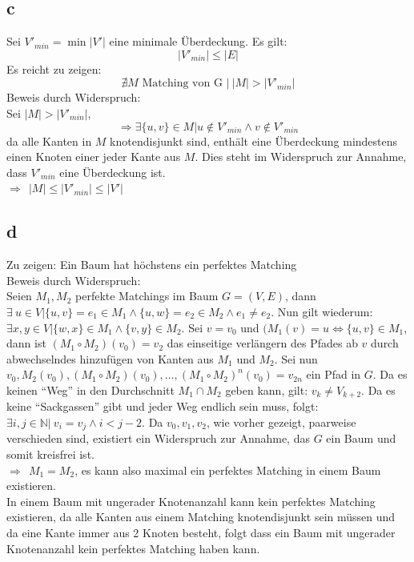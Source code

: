 \documentclass[a4paper,11pt,twoside]{scrartcl}
\begin{document}
\subsection*{c}
Sei $V'_{min} = \min{|V'|}$ eine minimale Überdeckung. Es gilt:
\[ |V'_{min}| \leq |E| \]
Es reicht zu zeigen:
\[ \nexists M \text{ Matching von G }| ~|M| > |V'_{min}| \]
Beweis durch Widerspruch:\\
Sei $|M| > |V'_{min}|$,
\[ \Rightarrow \exists \{u,v\} \in M | u \notin V'_{min} \land v \notin V'_{min} \]
da alle Kanten in $M$ knotendisjunkt sind, enthält eine Überdeckung mindestens einen Knoten einer jeder Kante aus $M$. Dies steht im Widerspruch zur Annahme, dass $V'_{min}$ eine Überdeckung ist.\\
$\Rightarrow~~|M| \leq |V'_{min}| \leq |V'|$ 
\subsection*{d}
Zu zeigen: Ein Baum hat höchstens ein perfektes Matching\\
Beweis durch Widerspruch:\\
Seien $M_1, M_2$ perfekte Matchings im Baum $G = (V,E)$, dann $\exists~ u \in V | \{u,v\} = e_1 \in M_1 \land \{u,w\} = e_2 \in M_2 \land e_1 \neq e_2$. Nun gilt wiederum: $\exists x,y \in V | \{ w,x \}\in M_1 \land \{ v,y \} \in M_2$. Sei $v=v_0$ und $ (M_1(v) = u \Leftrightarrow \{u,v\}\in M_1$, dann ist $(M_1 \circ M_2)(v_0) = v_2 $ das einseitige verlängern des Pfades ab $v$ durch abwechselndes hinzufügen von Kanten aus $M_1$ und $M_2$. Sei nun $ v_0, M_2(v_0), (M_1 \circ M_2)(v_0),\dots, (M_1 \circ M_2)^n(v_0)=v_{2n} $ ein Pfad in $G$. Da es keinen "`Weg"' in den Durchschnitt $M_1\cap M_2$ geben kann, gilt: $v_k \neq V_{k+2}$. Da es keine "`Sackgassen"' gibt und jeder Weg endlich sein muss, folgt: $\exists i,j \in \mathbb{N} | ~ v_i = v_j \land i < j-2$. Da $v_0, v_1, v_2$, wie vorher gezeigt, paarweise verschieden sind, existiert ein Widerspruch zur Annahme, das $G$ ein Baum und somit kreisfrei ist.\\
$\Rightarrow ~~M_1 = M_2$, es kann also maximal ein perfektes Matching in einem Baum existieren.\\

In einem Baum mit ungerader Knotenanzahl kann kein perfektes Matching existieren, da alle Kanten aus einem Matching knotendisjunkt sein müssen und da eine Kante immer aus 2 Knoten besteht, folgt dass ein Baum mit ungerader Knotenanzahl kein perfektes Matching haben kann.
\end{document}
